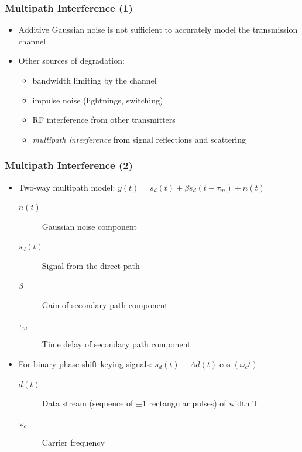 \documentclass{beamer}
\begin{document}
\begin{frame}
	\frametitle{Multipath Interference (1)}
	\begin{itemize}
		\item Additive Gaussian noise is not sufficient to accurately model the transmission channel
		\item Other sources of degradation:
		\begin{itemize}
			\item bandwidth limiting by the channel
			\item impulse noise (lightnings, switching)
			\item RF interference from other transmitters
			\item \emph{multipath interference} from signal reflections and scattering
		\end{itemize}
	\end{itemize}
\end{frame}

\begin{frame}
	\frametitle{Multipath Interference (2)}
	\begin{itemize}
		\item Two-way multipath model: $ y(t) = s_d(t) + \beta s_d(t - \tau_m) + n(t) $
		\begin{description}
			\item[$ n(t) $] Gaussian noise component
			\item[$ s_d(t) $] Signal from the direct path
			\item[$ \beta $] Gain of secondary path component
			\item[$ \tau_m $] Time delay of secondary path component
		\end{description}
		\item For binary phase-shift keying signals: $ s_d(t) - Ad(t)\cos(\omega_c t) $
		\begin{description}
			\item[$ d(t) $] Data stream (sequence of $ \pm1 $ rectangular pulses) of width T
			\item[$ \omega_c $] Carrier frequency
		\end{description}
	\end{itemize}
\end{frame}
\end{document}
